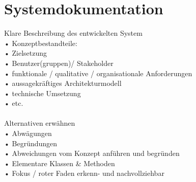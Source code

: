 
\chapter{Systemdokumentation}

Klare Beschreibung des entwickelten System\\
• Konzeptbestandteile:\\
• Zielsetzung\\
• Benutzer(gruppen)/ Stakeholder\\
• funktionale / qualitative / organisationale Anforderungen\\
• aussagekräftiges Architekturmodell\\
• technische Umsetzung\\
• etc.\\
\\
Alternativen erwähnen\\
• Abwägungen\\
• Begründungen\\
• Abweichungen vom Konzept anführen und begründen\\
• Elementare Klassen & Methoden\\
• Fokus / roter Faden erkenn- und nachvollziehbar\\


\newpage



\newpage



\newpage



\newpage





